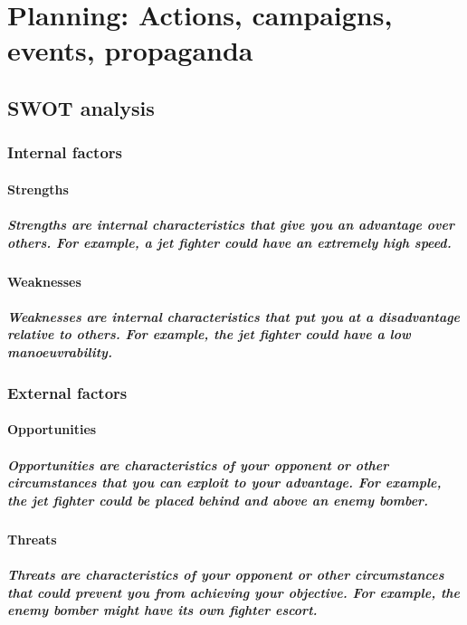  \chapter{Planning: Actions, campaigns, events, propaganda}
  	\section{SWOT analysis}
      \subsection{Internal factors}
    	\subsubsection{Strengths}
        \paragraph{Strengths are internal characteristics that give you an advantage over others. For example, a jet fighter could have an extremely high speed.}
        \subsubsection{Weaknesses}
        \paragraph{Weaknesses are internal characteristics that put you at a disadvantage relative to others. For example, the jet fighter could have a low manoeuvrability.}
      \subsection{External factors}
        \subsubsection{Opportunities}
        \paragraph{Opportunities are characteristics of your opponent or other circumstances that you can exploit to your advantage. For example, the jet fighter could be placed behind and above an enemy bomber.}
        \subsubsection{Threats}
        \paragraph{Threats are characteristics of your opponent or other circumstances that could prevent you from achieving your objective. For example, the enemy bomber might have its own fighter escort.}